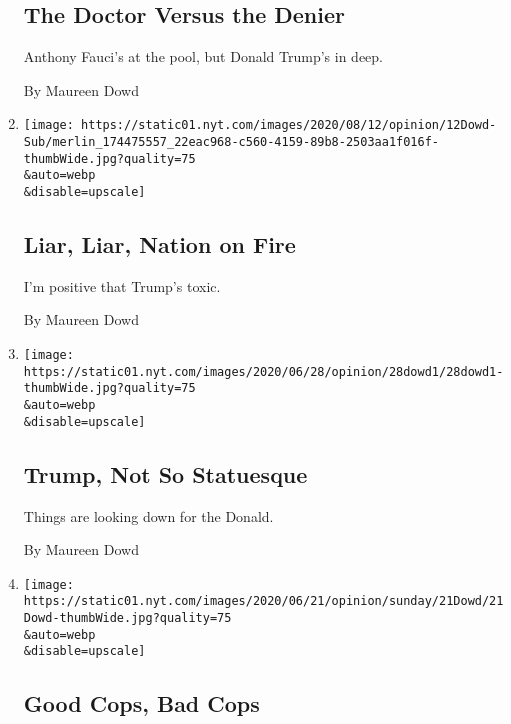 \begin{enumerate}
  \hypertarget{the-doctor-versus-the-denier}{%
  \subsection{The Doctor Versus the
  Denier}\label{the-doctor-versus-the-denier}}

  Anthony Fauci's at the pool, but Donald Trump's in deep.

  By Maureen Dowd
\item
  \href{/2020/07/11/opinion/sunday/trump-biden-2020.html}{}

  \texttt{[image: https://static01.nyt.com/images/2020/08/12/opinion/12Dowd-Sub/merlin\_174475557\_22eac968-c560-4159-89b8-2503aa1f016f-thumbWide.jpg?quality=75\\\&auto=webp\\\&disable=upscale]}

  \hypertarget{liar-liar-nation-on-fire}{%
  \subsection{Liar, Liar, Nation on
  Fire}\label{liar-liar-nation-on-fire}}

  I'm positive that Trump's toxic.

  By Maureen Dowd
\item
  \href{/2020/06/27/opinion/sunday/trump-statues-2020-reelection.html}{}

  \texttt{[image: https://static01.nyt.com/images/2020/06/28/opinion/28dowd1/28dowd1-thumbWide.jpg?quality=75\\\&auto=webp\\\&disable=upscale]}

  \hypertarget{trump-not-so-statuesque}{%
  \subsection{Trump, Not So Statuesque}\label{trump-not-so-statuesque}}

  Things are looking down for the Donald.

  By Maureen Dowd
\item
  \href{/2020/06/20/opinion/sunday/police-good-cops-fathers-day.html}{}

  \texttt{[image: https://static01.nyt.com/images/2020/06/21/opinion/sunday/21Dowd/21Dowd-thumbWide.jpg?quality=75\\\&auto=webp\\\&disable=upscale]}

  \hypertarget{good-cops-bad-cops}{%
  \subsection{Good Cops, Bad Cops}\label{good-cops-bad-cops}}


\end{enumerate}

